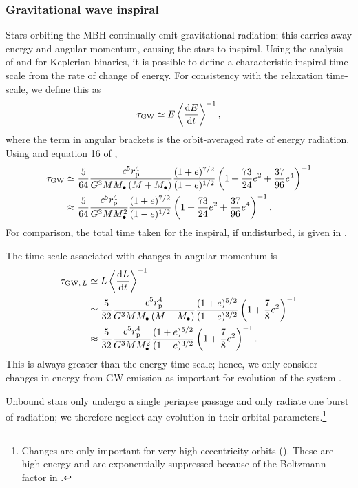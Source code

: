 \subsubsection{Gravitational wave inspiral}\label{sec:GW-in}

Stars orbiting the MBH continually emit gravitational radiation; this carries away energy and angular momentum, causing the stars to inspiral. Using the analysis of \citet{Peters1963} and \citet{Peters1964} for Keplerian binaries, it is possible to define a characteristic inspiral time-scale from the rate of change of energy. For consistency with the relaxation time-scale, we define this as \citep{MiraldaEscude2000, Merritt2011}
\begin{equation}
\tau_\mathrm{GW} \simeq E\left\langle\dfrac{\mathrm{d} {E}}{\mathrm{d} {t}}\right\rangle^{-1},
\label{eq:tGW-def}
\end{equation}
where the term in angular brackets is the orbit-averaged rate of energy radiation. Using  and equation 16 of \citet{Peters1963},
\begin{align}
\tau_\mathrm{GW} \simeq {} & \dfrac{5}{64}\dfrac{c^5r_\mathrm{p}^4}{G^3MM_\bullet\left(M + M_\bullet\right)}\dfrac{(1+e)^{7/2}}{(1-e)^{1/2}}\left(1+\dfrac{73}{24}e^2 + \dfrac{37}{96}e^4\right)^{-1} \\
 \approx {} & \dfrac{5}{64}\dfrac{c^5r_\mathrm{p}^4}{G^3MM_\bullet^2}\dfrac{(1+e)^{7/2}}{(1-e)^{1/2}}\left(1+\dfrac{73}{24}e^2 + \dfrac{37}{96}e^4\right)^{-1}.
\end{align}
For comparison, the total time taken for the inspiral, if undisturbed, is given in .

The time-scale associated with changes in angular momentum is \citep{Peters1964}
\begin{align}
\tau_{\mathrm{GW},\, L} \simeq {} & L\left\langle\dfrac{\mathrm{d} {L}}{\mathrm{d} {t}}\right\rangle^{-1} \\
 \simeq {} & \dfrac{5}{32}\dfrac{c^5r_\mathrm{p}^4}{G^3MM_\bullet\left(M + M_\bullet\right)}\dfrac{(1+e)^{5/2}}{(1-e)^{3/2}}\left(1+\dfrac{7}{8}e^2\right)^{-1} \\
 \approx {} & \dfrac{5}{32}\dfrac{c^5r_\mathrm{p}^4}{G^3MM_\bullet^2}\dfrac{(1+e)^{5/2}}{(1-e)^{3/2}}\left(1+\dfrac{7}{8}e^2\right)^{-1}.
\end{align}
This is always greater than the energy time-scale; hence, we only consider changes in energy from GW emission as important for evolution of the system \citep{Hopman2005}.

Unbound stars only undergo a single periapse passage and only radiate one burst of radiation; we therefore neglect any evolution in their orbital parameters.\footnote{Changes are only important for very high eccentricity orbits (). These are high energy and are exponentially suppressed because of the Boltzmann factor in .}

